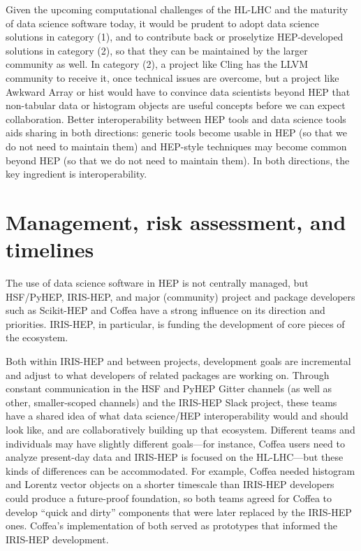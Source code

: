 \documentclass{article}
\begin{document}
Given the upcoming computational challenges of the HL-LHC and the maturity of data science software today, it would be prudent to adopt data science solutions in category (1), and to contribute back or proselytize HEP-developed solutions in category (2), so that they can be maintained by the larger community as well. In category (2), a project like Cling has the LLVM community to receive it, once technical issues are overcome, but a project like Awkward Array or hist would have to convince data scientists beyond HEP that non-tabular data or histogram objects are useful concepts before we can expect collaboration. Better interoperability between HEP tools and data science tools aids sharing in both directions: generic tools become usable in HEP (so that we do not need to maintain them) and HEP-style techniques may become common beyond HEP (so that we do not need to maintain them). In both directions, the key ingredient is interoperability.

\section{Management, risk assessment, and timelines}

The use of data science software in HEP is not centrally managed, but HSF/PyHEP, IRIS-HEP, and major (community) project and package developers such as Scikit-HEP and Coffea have a strong influence on its direction and priorities. IRIS-HEP, in particular, is funding the development of core pieces of the ecosystem.

Both within IRIS-HEP and between projects, development goals are incremental and adjust to what developers of related packages are working on. Through constant communication in the HSF and PyHEP Gitter channels (as well as other, smaller-scoped channels) and the IRIS-HEP Slack project, these teams have a shared idea of what data science/HEP interoperability would and should look like, and are collaboratively building up that ecosystem. Different teams and individuals may have slightly different goals---for instance, Coffea users need to analyze present-day data and IRIS-HEP is focused on the HL-LHC---but these kinds of differences can be accommodated. For example, Coffea needed histogram and Lorentz vector objects on a shorter timescale than IRIS-HEP developers could produce a future-proof foundation, so both teams agreed for Coffea to develop ``quick and dirty'' components that were later replaced by the IRIS-HEP ones. Coffea's implementation of both served as prototypes that informed the IRIS-HEP development.
\end{document}
